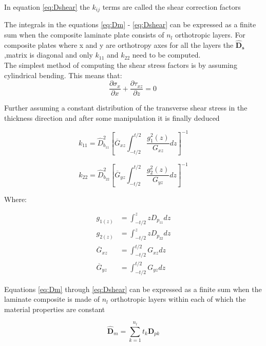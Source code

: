 In equation \eqref{eq:Dshear} the $k_{ij}$ terms are called the shear
correction factors

The integrals in the equations \eqref{eq:Dm} - \eqref{eq:Dshear} can be expressed as a finite sum
when the composite laminate plate consists of $n_{l}$ orthotropic
layers. For composite plates where x and y are orthotropy axes for all
the layers the ${\hat{\mathbf{D}}}_{\mathbf{s}}$ ,matrix is
diagonal and only $k_{11}$ and $k_{22}$ need to be computed.
\\
The simplest method of computing the shear stress factors is by assuming
cylindrical bending. This means that:
\begin{equation}
\frac{\partial\sigma_{x}}{\partial x} + \frac{\partial\tau_{xz}}{\partial z} = 0\ 
\end{equation}

Further assuming a constant distribution of the transverse shear stress
in the thickness direction and after some manipulation it is finally
deduced

\begin{equation}
k_{11} = {\hat{D}}_{b_{11}}^{2}\left\lbrack {\overline{G}}_{xz}\int_{- t\text{/}2}^{t\text{/}2}{\frac{g_{1}^{2}(z)}{G_{xz}}dz} \right\rbrack^{- 1}
\end{equation}

\begin{equation}
k_{22} = {\hat{D}}_{b_{22}}^{2}\left\lbrack {\overline{G}}_{yz}\int_{- t\text{/}2}^{t\text{/}2}{\frac{g_{2}^{2}(z)}{G_{yz}}dz} \right\rbrack^{- 1}
\end{equation}

Where:

\begin{align*}
  g_{1(z)} &= \int_{- t\text{/}2}^{z}{zD_{p_{11}}dz}\\
  g_{2(z)} &= \int_{- t\text{/}2}^{z}{zD_{p_{22}}dz}\\
  {\overline{G}}_{xz} &= \int_{- t\text{/}2}^{t\text{/}2}G_{xz}dz\\
  {\overline{G}}_{yz} &= \int_{- t\text{/}2}^{t\text{/}2}G_{yz}dz
\end{align*}


Equations \eqref{eq:Dm} through \eqref{eq:Dshear} can be expressed as a finite sum when
the laminate composite is made of $n_{l}$ orthotropic layers within
each of which the material properties are constant

\begin{equation}
{\hat{\mathbf{D}}}_{m} = \sum_{k = 1}^{n_{l}}{t_{k}\mathbf{D}_{pk}}
\end{equation}

